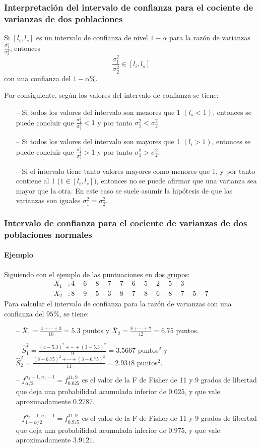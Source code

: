 \begin{frame}
\frametitle{Interpretación del intervalo de confianza para el cociente de varianzas de dos poblaciones}
Si $[l_i,l_s]$ es un intervalo de confianza de nivel $1-\alpha$ para la razón de varianzas $\frac{\sigma_1^2}{\sigma_2^2}$, entonces
\[
\frac{\sigma_1^2}{\sigma_2^2} \in [l_i,l_s]
\]
con una confianza del $1-\alpha\%$.

Por consiguiente, según los valores del intervalo de confianza se tiene:
\begin{itemize}
\item[--] Si todos los valores del intervalo son menores que 1 $(l_s<1)$, entonces se puede concluir que
$\frac{\sigma_1^2}{\sigma_2^2}<1$  y por tanto $\sigma_1^2<\sigma_2^2$.
\item[--] Si todos los valores del intervalo son mayores que 1 $(l_i>1)$, entonces se puede concluir que
$\frac{\sigma_1^2}{\sigma_2^2}>1$  y por tanto $\sigma_1^2>\sigma_2^2$.
\item[--] Si el intervalo tiene tanto valores mayores como menores que 1, y por tanto contiene al 1 ($1\in [l_i,l_s])$,
entonces no se puede afirmar que una varianza sea mayor que la otra. En este caso se suele asumir la hipótesis de que las varianzas son iguales $\sigma_1^2=\sigma_2^2$.
\end{itemize}
\end{frame}


\begin{frame}
\frametitle{Intervalo de confianza para el cociente de varianzas de dos poblaciones normales}
\framesubtitle{Ejemplo}
Siguiendo con el ejemplo de las puntuaciones en dos grupos:
\begin{align*}
X_1 &: 4 - 6 - 8 - 7 - 7 - 6 - 5 - 2 - 5 - 3 \\
X_2 &: 8 - 9 - 5 - 3 - 8 - 7 - 8 - 6 - 8 - 7 - 5 - 7
\end{align*}
Para calcular el intervalo de confianza para la razón de varianzas con una confianza del $95\%$, se tiene:
\begin{itemize}
\item[--] $\bar{X}_1 = \frac{4+\cdots +3}{10}=5.3$ puntos y $\bar{X}_2=\frac{8+\cdots +7}{12}=6.75$ puntos.
\item[--] $\hat{S}_1^2= \frac{(4-5.3)^2+\cdots + (3-5.3)^2}{9}=3.5667 $ puntos$^2$ y $\hat{S}_2^2=
\frac{(8-6.75)^2+\cdots + (3-6.75)^2}{11}=2.9318$ puntos$^2$.
\item[--] $f^{n_2-1,n_1-1}_{\alpha/2}=f^{11,9}_{0.025}$ es el valor de la F de Fisher de 11 y 9 grados de libertad que
deja una probabilidad acumulada inferior de $0.025$, y que vale aproximadamente $0.2787$.
\item[--] $f^{n_2-1,n_1-1}_{1-\alpha/2}=f^{11,9}_{0.975}$ es el valor de la F de Fisher de 11 y 9 grados de libertad
que deja una probabilidad acumulada inferior de $0.975$, y que vale aproximadamente $3.9121$.
\end{itemize}
\end{frame}


